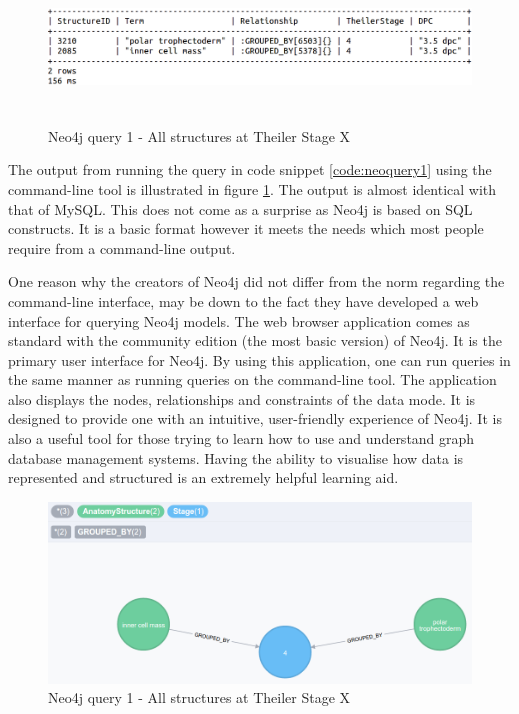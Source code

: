 \begin{figure}[H]\begin{center}\includegraphics[height=4cm,width=0.9\linewidth]{images/neo4jquery1terminal}\caption{Neo4j query 1 - All structures at Theiler Stage X}\label{fig:neo4jquery1terminal}\end{center}\end{figure}

The output from running the query in code snippet \ref{code:neoquery1} using the command-line tool is illustrated in figure \ref{fig:neo4jquery1terminal}. The output is almost identical with that of MySQL. This does not come as a surprise as Neo4j is based on SQL constructs. It is a basic format however it meets the needs which most people require from a command-line output.

One reason why the creators of Neo4j did not differ from the norm regarding the command-line interface, may be down to the fact they have developed a web interface for querying Neo4j models. The web browser application comes as standard with the community edition (the most basic version) of Neo4j. It is the primary user interface for Neo4j. By using this application, one can run queries in the same manner as running queries on the command-line tool. The application also displays the nodes, relationships and constraints of the data mode. It is designed to provide one with an intuitive, user-friendly experience of Neo4j. It is also a useful tool for those trying to learn how to use and understand graph database management systems. Having the ability to visualise how data is represented and structured is an extremely helpful learning aid.

\begin{figure}[H]\begin{center}\includegraphics[width=1\linewidth]{images/neo4jquery1graph}\caption{Neo4j query 1 - All structures at Theiler Stage X}\label{fig:neo4jquery1graph}\end{center}\end{figure}


